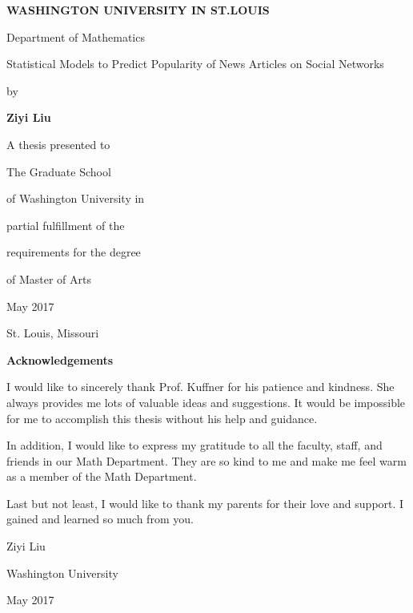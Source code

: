 \documentclass[12pt]{article}
\begin{document}
\thispagestyle{empty}
\vspace*{1\baselineskip}
\centerline{\bf{WASHINGTON UNIVERSITY IN ST.LOUIS}}
\vspace*{1\baselineskip}
\centerline{Department of Mathematics}
\vspace*{8\baselineskip}
\centerline{Statistical Models to Predict Popularity of News Articles on Social Networks}
\vspace*{2\baselineskip}
\centerline{by}
\vspace*{1\baselineskip}
\centerline{\bf{Ziyi Liu}}
\vspace*{12\baselineskip}
\centerline{A thesis presented to}
\centerline{The Graduate School} 
\centerline{of Washington University in}
\centerline{partial fulfillment of the}
\centerline{requirements for the degree}
\centerline{of Master of Arts}
\vspace*{4\baselineskip}
\centerline{May 2017}
\vspace*{1\baselineskip}
\centerline{St. Louis, Missouri}
\clearpage

\doublespacing

\setcounter{page}{2}
\tableofcontents
\newpage

\listoffigures
\newpage

\listoftables
\clearpage

\vspace*{1\baselineskip}
\centerline{\bf{Acknowledgements}}
\vspace*{4\baselineskip}
I would like to sincerely thank Prof. Kuffner for his patience and kindness. She always provides me lots of valuable ideas and suggestions. It would be impossible for me to accomplish this thesis without his help and guidance.
\vspace*{1\baselineskip}

In addition, I would like to express my gratitude to all the faculty, staff, and friends in our Math Department. They are so kind to me and make me feel warm as a member of the Math Department.
\vspace*{1\baselineskip}

Last but not least, I would like to thank my parents for their love and support. I gained and learned so much from you.

\vspace*{4\baselineskip}
\centerline{Ziyi Liu}
\centerline{Washington University}
\centerline{May 2017}
\end{document}
